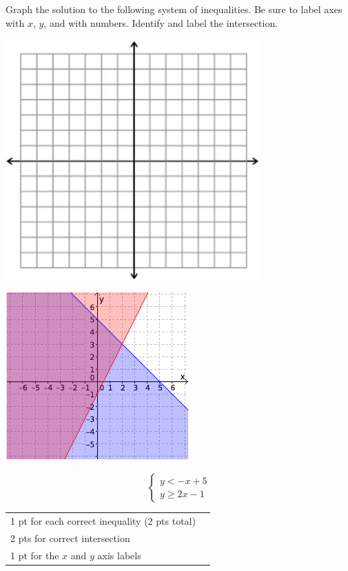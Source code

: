 {
	Graph the solution to the following system of inequalities. Be sure to label axes with $x$, $y$, and with numbers. Identify and label the intersection. \begin{onlyproblem}\begin{center}\includegraphics{fig-graphpaper.png}\end{center}\end{onlyproblem} \begin{onlysolution}\begin{center}\includegraphics{fig095-12-b-answer}\end{center}\end{onlysolution}
	$$\begin{cases} y<-x+5\\ y\geq 2x-1\end{cases}$$
}
{
	\begin{tabular}{l r}
	1 pt for each correct inequality (2 pts total)\\
	2 pts for correct intersection\\
	1 pt for the $x$ and $y$ axis labels\\
	\end{tabular}
}


